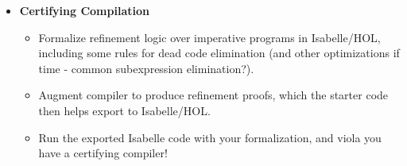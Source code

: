 \documentclass{article}
\begin{document}
\begin{itemize}
 \item
 \textbf{Certifying Compilation}
 \begin{itemize}
 \item Formalize refinement logic over imperative programs in Isabelle/HOL, including some rules for dead code elimination (and other optimizations if time - common subexpression elimination?).
 \item Augment compiler to produce refinement proofs, which the starter code then helps export to Isabelle/HOL.
 \item Run the exported Isabelle code with your formalization, and viola you have a certifying compiler!
 \end{itemize}

 

\end{itemize}
\end{document}
